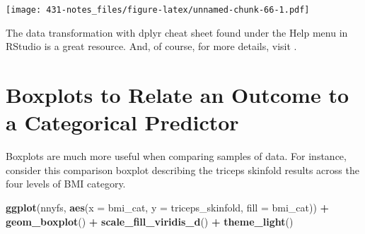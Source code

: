 \documentclass[
]{book}
\newenvironment{Shaded}{\begin{snugshade}}{\end{snugshade}}
\newcommand{\DataTypeTok}[1]{\textcolor[rgb]{0.13,0.29,0.53}{#1}}
\newcommand{\FloatTok}[1]{\textcolor[rgb]{0.00,0.00,0.81}{#1}}
\newcommand{\KeywordTok}[1]{\textcolor[rgb]{0.13,0.29,0.53}{\textbf{#1}}}
\newcommand{\NormalTok}[1]{#1}
\newcommand{\OperatorTok}[1]{\textcolor[rgb]{0.81,0.36,0.00}{\textbf{#1}}}
\newcommand{\OtherTok}[1]{\textcolor[rgb]{0.56,0.35,0.01}{#1}}
\newcommand{\StringTok}[1]{\textcolor[rgb]{0.31,0.60,0.02}{#1}}
\begin{document}
\begin{Shaded}
\end{Shaded}

\texttt{[image: 431-notes\_files/figure-latex/unnamed-chunk-66-1.pdf]}

The data transformation with dplyr cheat sheet found under the Help menu in RStudio is a great resource. And, of course, for more details, visit \citet{R4DS}.

\hypertarget{boxplots-to-relate-an-outcome-to-a-categorical-predictor}{%
\section{Boxplots to Relate an Outcome to a Categorical Predictor}\label{boxplots-to-relate-an-outcome-to-a-categorical-predictor}}

Boxplots are much more useful when comparing samples of data. For instance, consider this comparison boxplot describing the triceps skinfold results across the four levels of BMI category.

\begin{Shaded}
\begin{Highlighting}[]
\KeywordTok{ggplot}\NormalTok{(nnyfs, }\KeywordTok{aes}\NormalTok{(}\DataTypeTok{x =}\NormalTok{ bmi_cat, }\DataTypeTok{y =}\NormalTok{ triceps_skinfold,}
                  \DataTypeTok{fill =}\NormalTok{ bmi_cat)) }\OperatorTok{+}
\StringTok{    }\KeywordTok{geom_boxplot}\NormalTok{() }\OperatorTok{+}
\StringTok{    }\KeywordTok{scale_fill_viridis_d}\NormalTok{() }\OperatorTok{+}
\StringTok{    }\KeywordTok{theme_light}\NormalTok{()}
\end{Highlighting}
\end{Shaded}
\end{document}

